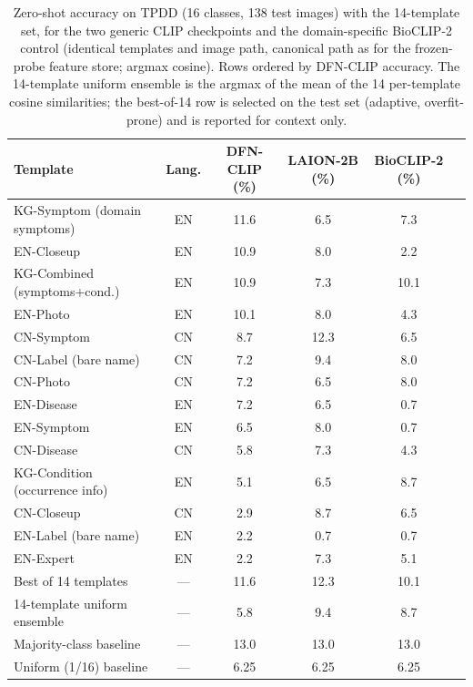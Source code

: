\documentclass[10pt,a4paper]{article}
\begin{document}
\begin{table}[!ht]
\centering
\caption{Zero-shot accuracy on TPDD (16 classes, 138 test images) with the 14-template set, for the two generic CLIP checkpoints and the domain-specific BioCLIP-2 control (identical templates and image path, canonical path as for the frozen-probe feature store; argmax cosine). Rows ordered by DFN-CLIP accuracy. The 14-template uniform ensemble is the argmax of the mean of the 14 per-template cosine similarities; the best-of-14 row is selected on the test set (adaptive, overfit-prone) and is reported for context only.}
\label{tab:prompts}
\setlength{\tabcolsep}{4pt}
\begin{tabular}{lccccc}
\toprule
\textbf{Template} & \textbf{Lang.} & \textbf{DFN-CLIP (\%)} & \textbf{LAION-2B (\%)} & \textbf{BioCLIP-2 (\%)} \\
\midrule
KG-Symptom (domain symptoms)    & EN & 11.6 & 6.5 & 7.3 \\
EN-Closeup                      & EN & 10.9 & 8.0 & 2.2 \\
KG-Combined (symptoms+cond.)    & EN & 10.9 & 7.3 & 10.1 \\
EN-Photo                        & EN & 10.1 & 8.0 & 4.3 \\
CN-Symptom                      & CN & 8.7 & 12.3 & 6.5 \\
CN-Label (bare name)            & CN & 7.2 & 9.4 & 8.0 \\
CN-Photo                        & CN & 7.2 & 6.5 & 8.0 \\
EN-Disease                      & EN & 7.2 & 6.5 & 0.7 \\
EN-Symptom                      & EN & 6.5 & 8.0 & 0.7 \\
CN-Disease                      & CN & 5.8 & 7.3 & 4.3 \\
KG-Condition (occurrence info)  & EN & 5.1 & 6.5 & 8.7 \\
CN-Closeup                      & CN & 2.9 & 8.7 & 6.5 \\
EN-Label (bare name)            & EN & 2.2 & 0.7 & 0.7 \\
EN-Expert                       & EN & 2.2 & 7.3 & 5.1 \\
\midrule
Best of 14 templates            & --- & 11.6 & 12.3 & 10.1 \\
14-template uniform ensemble    & --- & 5.8 & 9.4 & 8.7 \\
Majority-class baseline         & --- & 13.0 & 13.0 & 13.0 \\
Uniform (1/16) baseline         & --- & 6.25 & 6.25 & 6.25 \\
\bottomrule
\end{tabular}
\end{table}
\end{document}
